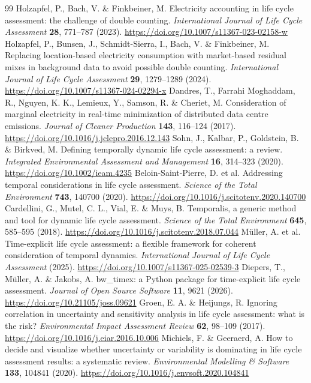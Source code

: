 \documentclass[review,a4paper,fleqn]{cas-sc}
\begin{document}
\begin{thebibliography}{99}
 Holzapfel, P., Bach, V. \& Finkbeiner, M. Electricity accounting in life cycle assessment: the challenge of double counting. \textit{International Journal of Life Cycle Assessment} \textbf{28}, 771--787 (2023). \url{https://doi.org/10.1007/s11367-023-02158-w}
 Holzapfel, P., Bunsen, J., Schmidt-Sierra, I., Bach, V. \& Finkbeiner, M. Replacing location-based electricity consumption with market-based residual mixes in background data to avoid possible double counting. \textit{International Journal of Life Cycle Assessment} \textbf{29}, 1279--1289 (2024). \url{https://doi.org/10.1007/s11367-024-02294-x}
 Dandres, T., Farrahi Moghaddam, R., Nguyen, K. K., Lemieux, Y., Samson, R. \& Cheriet, M. Consideration of marginal electricity in real-time minimization of distributed data centre emissions. \textit{Journal of Cleaner Production} \textbf{143}, 116--124 (2017). \url{https://doi.org/10.1016/j.jclepro.2016.12.143}
 Sohn, J., Kalbar, P., Goldstein, B. \& Birkved, M. Defining temporally dynamic life cycle assessment: a review. \textit{Integrated Environmental Assessment and Management} \textbf{16}, 314--323 (2020). \url{https://doi.org/10.1002/ieam.4235}
 Beloin-Saint-Pierre, D. et al. Addressing temporal considerations in life cycle assessment. \textit{Science of the Total Environment} \textbf{743}, 140700 (2020). \url{https://doi.org/10.1016/j.scitotenv.2020.140700}
 Cardellini, G., Mutel, C. L., Vial, E. \& Muys, B. Temporalis, a generic method and tool for dynamic life cycle assessment. \textit{Science of the Total Environment} \textbf{645}, 585--595 (2018). \url{https://doi.org/10.1016/j.scitotenv.2018.07.044}
 Müller, A. et al. Time-explicit life cycle assessment: a flexible framework for coherent consideration of temporal dynamics. \textit{International Journal of Life Cycle Assessment} (2025). \url{https://doi.org/10.1007/s11367-025-02539-3}
 Diepers, T., Müller, A. \& Jakobs, A. bw\_timex: a Python package for time-explicit life cycle assessment. \textit{Journal of Open Source Software} \textbf{11}, 9621 (2026). \url{https://doi.org/10.21105/joss.09621}
 Groen, E. A. \& Heijungs, R. Ignoring correlation in uncertainty and sensitivity analysis in life cycle assessment: what is the risk? \textit{Environmental Impact Assessment Review} \textbf{62}, 98--109 (2017). \url{https://doi.org/10.1016/j.eiar.2016.10.006}
 Michiels, F. \& Geeraerd, A. How to decide and visualize whether uncertainty or variability is dominating in life cycle assessment results: a systematic review. \textit{Environmental Modelling \& Software} \textbf{133}, 104841 (2020). \url{https://doi.org/10.1016/j.envsoft.2020.104841}

\end{thebibliography}
\end{document}
